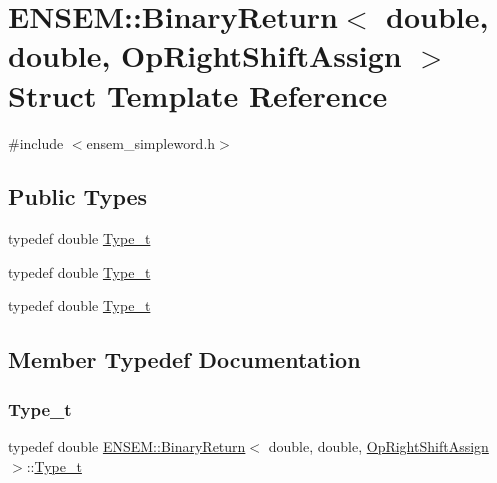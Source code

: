 \hypertarget{structENSEM_1_1BinaryReturn_3_01double_00_01double_00_01OpRightShiftAssign_01_4}{}\section{E\+N\+S\+EM\+:\+:Binary\+Return$<$ double, double, Op\+Right\+Shift\+Assign $>$ Struct Template Reference}
\label{structENSEM_1_1BinaryReturn_3_01double_00_01double_00_01OpRightShiftAssign_01_4}


{\ttfamily \#include $<$ensem\+\_\+simpleword.\+h$>$}

\subsection*{Public Types}
\begin{DoxyCompactItemize}
\item 
typedef double \mbox{\hyperlink{structENSEM_1_1BinaryReturn_3_01double_00_01double_00_01OpRightShiftAssign_01_4_a4a608032925ea3919409492676f39f69}{Type\+\_\+t}}
\item 
typedef double \mbox{\hyperlink{structENSEM_1_1BinaryReturn_3_01double_00_01double_00_01OpRightShiftAssign_01_4_a4a608032925ea3919409492676f39f69}{Type\+\_\+t}}
\item 
typedef double \mbox{\hyperlink{structENSEM_1_1BinaryReturn_3_01double_00_01double_00_01OpRightShiftAssign_01_4_a4a608032925ea3919409492676f39f69}{Type\+\_\+t}}
\end{DoxyCompactItemize}


\subsection{Member Typedef Documentation}
\mbox{\label{structENSEM_1_1BinaryReturn_3_01double_00_01double_00_01OpRightShiftAssign_01_4_a4a608032925ea3919409492676f39f69}} 
\subsubsection{\texorpdfstring{Type\_t}{Type\_t}\hspace{0.1cm}{\footnotesize\ttfamily [1/3]}}
{\footnotesize\ttfamily typedef double \mbox{\hyperlink{structENSEM_1_1BinaryReturn}{E\+N\+S\+E\+M\+::\+Binary\+Return}}$<$ double, double, \mbox{\hyperlink{structENSEM_1_1OpRightShiftAssign}{Op\+Right\+Shift\+Assign}} $>$\+::\mbox{\hyperlink{structENSEM_1_1BinaryReturn_3_01double_00_01double_00_01OpRightShiftAssign_01_4_a4a608032925ea3919409492676f39f69}{Type\+\_\+t}}}

